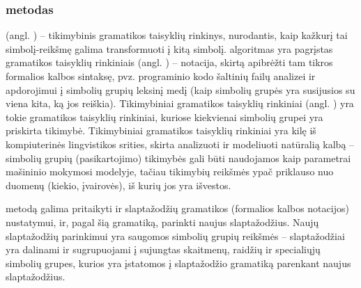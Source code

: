 \documentclass{VUMIFInfBakalaurinis}
\begin{document}
\subsubsection{ metodas}
 (angl. ) -- 
tikimybinis gramatikos taisyklių rinkinys, nurodantis, kaip kažkurį tai 
simbolį-reikšmę galima transformuoti į kitą simbolį.  algoritmas 
yra pagrįstas gramatikos taisyklių rinkiniais (angl. ) -- notacija, skirtą apibrėžti tam tikros formalios kalbos sintaksę, 
pvz. programinio kodo šaltinių failų analizei ir apdorojimui į simbolių grupių 
leksinį medį (kaip simbolių grupės yra susijusios su viena kita, ką jos 
reiškia). Tikimybiniai gramatikos taisyklių rinkiniai (angl. 
) yra tokie gramatikos taisyklių 
rinkiniai, kuriose kiekvienai simbolių grupei yra priskirta tikimybė. 
Tikimybiniai gramatikos taisyklių rinkiniai yra kilę iš kompiuterinės 
lingvistikos srities, skirta analizuoti ir modeliuoti natūralią kalbą -- 
simbolių grupių (pasikartojimo) tikimybės gali būti naudojamos kaip parametrai 
mašininio mokymosi modelyje, tačiau tikimybių reikšmės ypač priklauso nuo 
duomenų (kiekio, įvairovės), iš kurių jos yra išvestos.

 metodą galima pritaikyti ir slaptažodžių gramatikos (formalios 
kalbos notacijos) nustatymui, ir, pagal šią gramatiką, parinkti naujus 
slaptažodžius. Naujų slaptažodžių parinkimui yra saugomos simbolių grupių 
reikšmės -- slaptažodžiai yra dalinami ir sugrupuojami į sujungtas skaitmenų, 
raidžių ir specialiųjų simbolių grupes, kurios yra įstatomos į slaptažodžio 
gramatiką parenkant naujus slaptažodžius.
\end{document}
